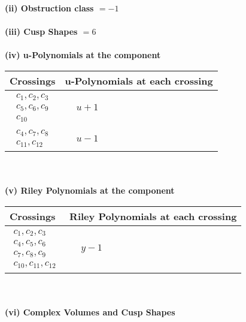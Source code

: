 \documentclass[1p]{elsarticle_modified}
\theoremstyle{definition}
\begin{document}
\flushleft \textbf{(ii) Obstruction class $= -1$}\\~\\
\flushleft \textbf{(iii) Cusp Shapes $= 6$}\\~\\
\newpage\renewcommand{\arraystretch}{1}
\flushleft \textbf{(iv) u-Polynomials at the component}\newline \\
\begin{tabular}{m{50pt}|m{274pt}}
Crossings & \hspace{64pt}u-Polynomials at each crossing \\
\hline $$\begin{aligned}c_{1},c_{2},c_{3}\\c_{5},c_{6},c_{9}\\c_{10}\end{aligned}$$&$\begin{aligned}
&u+1
\end{aligned}$\\
\hline $$\begin{aligned}c_{4},c_{7},c_{8}\\c_{11},c_{12}\end{aligned}$$&$\begin{aligned}
&u-1
\end{aligned}$\\
\hline
\end{tabular}\\~\\
\newpage\renewcommand{\arraystretch}{1}
\flushleft \textbf{(v) Riley Polynomials at the component}\newline \\
\begin{tabular}{m{50pt}|m{274pt}}
Crossings & \hspace{64pt}Riley Polynomials at each crossing \\
\hline $$\begin{aligned}c_{1},c_{2},c_{3}\\c_{4},c_{5},c_{6}\\c_{7},c_{8},c_{9}\\c_{10},c_{11},c_{12}\end{aligned}$$&$\begin{aligned}
&y-1
\end{aligned}$\\
\hline
\end{tabular}\\~\\
\newpage\flushleft \textbf{(vi) Complex Volumes and Cusp Shapes}
\end{document}
